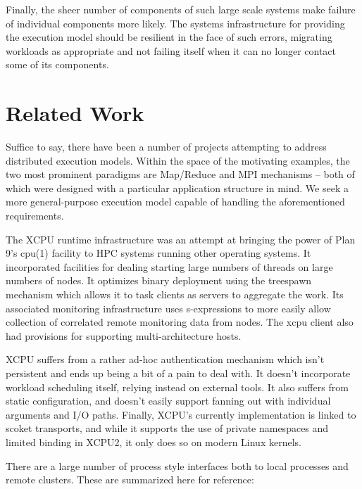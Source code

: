 \documentclass{sig-alternate}
\begin{document}
Finally, the sheer number of components of such large scale systems make
failure of individual components more likely.  The systems infrastructure
for providing the execution model should be resilient in the face of
such errors, migrating workloads as appropriate and not failing itself when
it can no longer contact some of its components.

\section{Related Work}

Suffice to say, there have been a number of projects attempting to
address distributed execution models.  Within the space of the motivating
examples, the two most prominent paradigms are Map/Reduce and MPI
mechanisms -- both of which were designed with a particular application
structure in mind.  We seek a more general-purpose execution model
capable of handling the aforementioned requirements.

The XCPU runtime infrastructure was an attempt at bringing
the power of Plan 9's cpu(1) facility to HPC systems running
other operating systems.   It incorporated facilities for dealing
starting large numbers of threads on large numbers of nodes.  It
optimizes binary deployment using the treespawn mechanism which allows
it to task clients as servers to aggregate the work.  Its associated
monitoring infrastructure uses s-expressions to more easily allow
collection of correlated remote monitoring data from nodes.
The xcpu client also had provisions for supporting multi-architecture
hosts.

XCPU suffers from a rather ad-hoc authentication mechanism which isn't
persistent and ends up being a bit of a pain to deal with.  It doesn't
incorporate workload scheduling itself, relying instead on external
tools.  It also suffers from static configuration, and doesn't easily
support fanning out with individual arguments and I/O paths.  Finally,
XCPU's currently implementation is linked to scoket transports, and while
it supports the use of private namespaces and limited binding in XCPU2,
it only does so on modern Linux kernels.

There are a large number of process style interfaces both to local
processes and remote clusters.  These are summarized here for reference:
\end{document}
